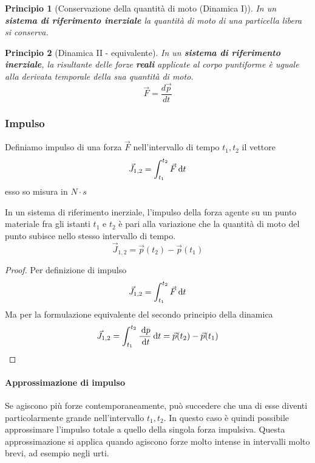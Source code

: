 \documentclass{article}
\newtheorem*{principio}{Principio}
\theoremstyle{plain}
\begin{document}
\begin{shaded}
    \begin{principio}[Conservazione della quantità di moto (Dinamica I)]
        In un \textbf{sistema di riferimento inerziale} la quantità di moto di una particella libera si conserva.
    \end{principio}
\end{shaded}

\begin{shaded}
    \begin{principio}[Dinamica II - equivalente]
        In un \textbf{sistema di riferimento inerziale}, la risultante delle forze \textbf{reali} applicate al corpo puntiforme è uguale alla derivata temporale della sua quantità di moto.
        \[\vec F =\frac{d \vec p}{dt}\]
    \end{principio}
\end{shaded}
\subsubsection{Impulso}
\begin{boxdef}
    Definiamo impulso di una forza $\vec F$ nell'intervallo di tempo $t_1,t_2$ il vettore
    \[\vec J_{1,2} =\int_{t_1}^{t_2}\vec F\:\text{d} t\]
    esso so misura in $N\cdot s$
\end{boxdef}

\begin{shadedTheorem}
    In un sistema di riferimento inerziale, l'impulso della forza agente su un punto materiale fra gli istanti $t_1$ e $t_2$ è pari alla variazione che la quantità di moto del punto subisce nello stesso intervallo di tempo.
    \[\vec J_{1,2} = \vec p(t_2) - \vec p(t_1)\]
\end{shadedTheorem}
\begin{proof}
    Per definizione di impulso 
    \[\vec J_{1,2} =\int_{t_1}^{t_2}\vec F\:\text{d} t\]
    Ma per la formulazione equivalente del secondo principio della dinamica
    \[\vec J_{1,2} =\int_{t_1}^{t_2}\frac{\:\text{d} p}{\:\text{d} t}\:\text{d} t = \vec p(t_2) - \vec p(t_1)\]
\end{proof}
\paragraph{Approssimazione di impulso}
Se agiscono più forze contemporaneamente, può succedere che una di esse diventi particolarmente grande nell'intervallo $t_1, t_2$. In questo caso è quindi possibile approssimare l'impulso totale a quello della singola forza impulsiva. Questa approssimazione si applica quando agiscono forze molto intense in intervalli molto brevi, ad esempio negli urti.
\end{document}
